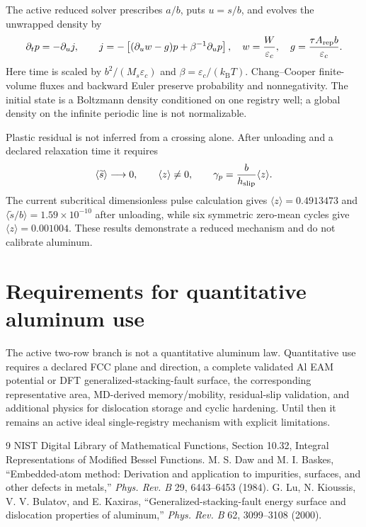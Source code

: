 \documentclass[11pt]{article}
\newcommand{\epsc}{\varepsilon_c}
\newcommand{\kB}{k_{\mathrm B}}
\begin{document}
The active reduced solver prescribes $a/b$, puts $u=s/b$, and evolves the
unwrapped density by
\begin{equation}
 \partial_t p=-\partial_u j,\qquad
 j=-\left[(\partial_u w-g)p+\beta^{-1}\partial_u p\right],
 \quad w={W\over\epsc},\quad
 g={\tau A_{\rm rep}b\over\epsc}.
\end{equation}
Here time is scaled by $b^2/(M_s\epsc)$ and
$\beta=\epsc/(\kB T)$. Chang--Cooper finite-volume fluxes and backward Euler
preserve probability and nonnegativity. The initial state is a Boltzmann
density conditioned on one registry well; a global density on the infinite
periodic line is not normalizable.

Plastic residual is not inferred from a crossing alone. After unloading and a
declared relaxation time it requires
\begin{equation}
 \langle\widetilde s\rangle\longrightarrow0,
 \qquad \langle z\rangle\ne0,
 \qquad \gamma_p={b\over h_{\rm slip}}\langle z\rangle.
\end{equation}
The current subcritical dimensionless pulse calculation gives
$\langle z\rangle=0.4913473$ and
$\langle\widetilde s/b\rangle=1.59\times10^{-10}$ after unloading, while six
symmetric zero-mean cycles give $\langle z\rangle=0.001004$. These results
demonstrate a reduced mechanism and do not calibrate aluminum.

\section{Requirements for quantitative aluminum use}

The active two-row branch is not a quantitative aluminum law. Quantitative use requires a
declared FCC plane and direction, a complete validated Al EAM potential or DFT
generalized-stacking-fault surface, the corresponding representative area,
MD-derived memory/mobility, residual-slip validation, and additional physics
for dislocation storage and cyclic hardening. Until then it remains an active
ideal single-registry mechanism with explicit limitations.



\begin{thebibliography}{9}
 NIST Digital Library of Mathematical Functions,
Section 10.32, Integral Representations of Modified Bessel Functions.
 M. S. Daw and M. I. Baskes, ``Embedded-atom method:
Derivation and application to impurities, surfaces, and other defects in
metals,'' \emph{Phys. Rev. B} 29, 6443--6453 (1984).
 G. Lu, N. Kioussis, V. V. Bulatov, and E. Kaxiras,
``Generalized-stacking-fault energy surface and dislocation properties of
aluminum,'' \emph{Phys. Rev. B} 62, 3099--3108 (2000).
\end{thebibliography}
\end{document}
